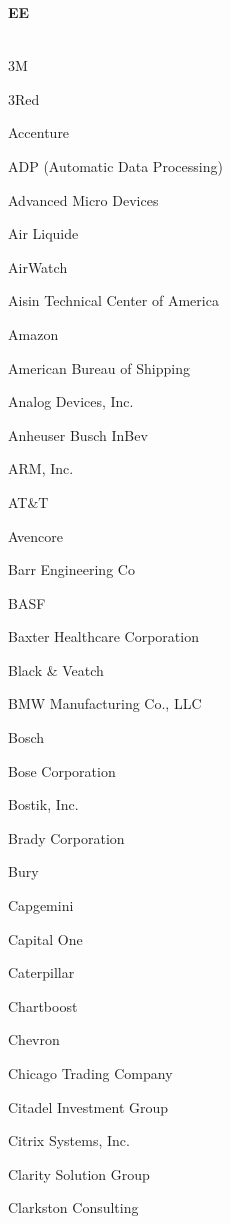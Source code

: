 \documentclass[twoside]{article}
\begin{document}
\begin{center}
\begin{multicols}{5}
        \vspace{1em}
        {\fontsize{14}{16}\selectfont \bf EE}\\
        \vspace{-1em}
        ~\hrulefill~
        \vspace{-.9em}
        \begin{FlushLeft}
        \begin{compactitem}
        \item 3M
\item 3Red
\item Accenture
\item ADP (Automatic Data Processing)
\item Advanced Micro Devices
\item Air Liquide
\item AirWatch
\item Aisin Technical Center of America
\item Amazon
\item American Bureau of Shipping
\item Analog Devices, Inc.
\item Anheuser Busch InBev
\item ARM, Inc.
\item AT\&T
\item Avencore
\item Barr Engineering Co
\item BASF
\item Baxter Healthcare Corporation
\item Black \& Veatch
\item BMW Manufacturing Co., LLC
\item Bosch
\item Bose Corporation
\item Bostik, Inc.
\item Brady Corporation
\item Bury
\item Capgemini
\item Capital One
\item Caterpillar
\item Chartboost
\item Chevron
\item Chicago Trading Company
\item Citadel Investment Group
\item Citrix Systems, Inc.
\item Clarity Solution Group
\item Clarkston Consulting

\end{compactitem}
\end{FlushLeft}
\end{multicols}
\end{center}
\end{document}
